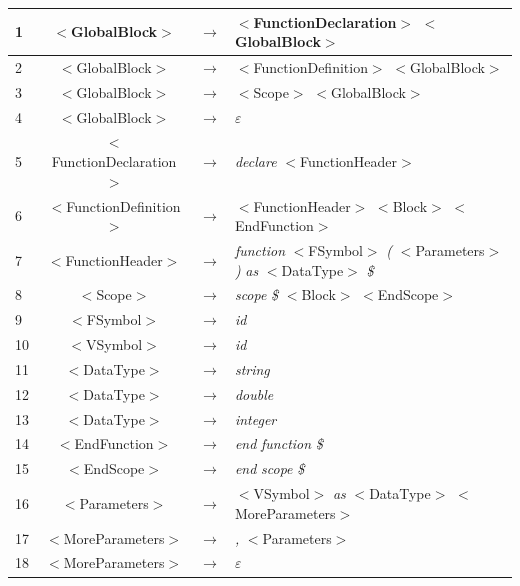 \documentclass[12pt,a4paper,titlepage]{article}
\begin{document}
\begin{center}
  \begin{tabular}{ | l | c  c  l | } \hline
    1  & $<$GlobalBlock$>$              & $\rightarrow$ & $<$FunctionDeclaration$>$ $<$GlobalBlock$>$ \\ \hline
    2  & $<$GlobalBlock$>$              & $\rightarrow$ & $<$FunctionDefinition$>$ $<$GlobalBlock$>$ \\ \hline
    3  & $<$GlobalBlock$>$              & $\rightarrow$ & $<$Scope$>$ $<$GlobalBlock$>$ \\ \hline
    4  & $<$GlobalBlock$>$              & $\rightarrow$ & $\varepsilon$ \\ \hline
    5  & $<$FunctionDeclaration$>$      & $\rightarrow$ & {\it declare} $<$FunctionHeader$>$ \\ \hline
    6  & $<$FunctionDefinition$>$       & $\rightarrow$ & $<$FunctionHeader$>$ $<$Block$>$ $<$EndFunction$>$ \\ \hline
    7  & $<$FunctionHeader$>$           & $\rightarrow$ & {\it function} $<$FSymbol$>$ {\it (} $<$Parameters$>$ {\it )} {\it as} $<$DataType$>$ {\it \$} \\ \hline
    8  & $<$Scope$>$                    & $\rightarrow$ & {\it scope} {\it \$} $<$Block$>$ $<$EndScope$>$ \\ \hline
    9  & $<$FSymbol$>$                  & $\rightarrow$ & {\it id} \\ \hline
    10 & $<$VSymbol$>$                  & $\rightarrow$ & {\it id} \\ \hline
    11 & $<$DataType$>$                 & $\rightarrow$ & {\it string} \\ \hline
    12 & $<$DataType$>$                 & $\rightarrow$ & {\it double} \\ \hline
    13 & $<$DataType$>$                 & $\rightarrow$ & {\it integer} \\ \hline
    14 & $<$EndFunction$>$              & $\rightarrow$ & {\it end} {\it function} {\it \$} \\ \hline
    15 & $<$EndScope$>$                 & $\rightarrow$ & {\it end} {\it scope} {\it \$} \\ \hline
    16 & $<$Parameters$>$               & $\rightarrow$ & $<$VSymbol$>$ {\it as} $<$DataType$>$ $<$MoreParameters$>$ \\ \hline
    17 & $<$MoreParameters$>$           & $\rightarrow$ & {\it ,} $<$Parameters$>$ \\ \hline
    18 & $<$MoreParameters$>$           & $\rightarrow$ & $\varepsilon$ \\ \hline

\end{tabular}
\end{center}
\end{document}
